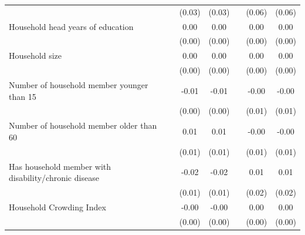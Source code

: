 {\begin{tabular}{l*{6}{c}}
                    &                     &      (0.03)         &      (0.03)         &                     &      (0.06)         &      (0.06)         \\
Household head years of education&                     &        0.00         &        0.00         &                     &        0.00         &        0.00         \\
                    &                     &      (0.00)         &      (0.00)         &                     &      (0.00)         &      (0.00)         \\
Household size      &                     &        0.00         &        0.00         &                     &        0.00         &        0.00         \\
                    &                     &      (0.00)         &      (0.00)         &                     &      (0.00)         &      (0.00)         \\
Number of household member younger than 15&                     &       -0.01         &       -0.01         &                     &       -0.00         &       -0.00         \\
                    &                     &      (0.00)         &      (0.00)         &                     &      (0.01)         &      (0.01)         \\
Number of household member older than 60&                     &        0.01         &        0.01         &                     &       -0.00         &       -0.00         \\
                    &                     &      (0.01)         &      (0.01)         &                     &      (0.01)         &      (0.01)         \\
Has household member with disability/chronic disease&                     &       -0.02         &       -0.02         &                     &        0.01         &        0.01         \\
                    &                     &      (0.01)         &      (0.01)         &                     &      (0.02)         &      (0.02)         \\
Household Crowding Index&                     &       -0.00         &       -0.00         &                     &        0.00         &        0.00         \\
                    &                     &      (0.00)         &      (0.00)         &                     &      (0.00)         &      (0.00)         \\

\end{tabular}}
